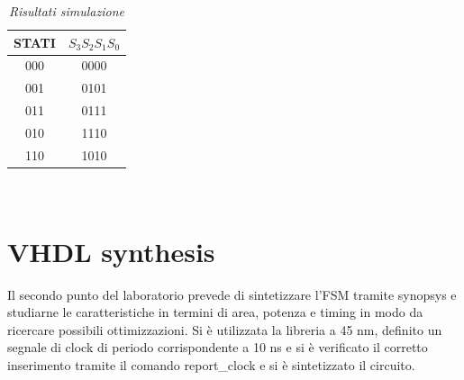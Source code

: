 \begin{table}[!h]\footnotesize
	\centering
	\begin{tabular}{|c|c|}
		\hline
		\textbf{STATI} & \textbf{$S_{3}S_{2}S_{1}S_{0}$}\\
		\hline
		000 & 0000\\
		\hline
		001 &0101 \\
		\hline
		011& 0111\\
		\hline
		010& 1110\\
		\hline
		110& 1010\\
		\hline 
	\end{tabular}
	\caption{\textit{Risultati simulazione}}
	\label{tab2}
\end{table} \\


\section{VHDL synthesis}
Il secondo punto del laboratorio prevede di sintetizzare l’FSM tramite synopsys e studiarne le caratteristiche in termini di area, potenza e timing in modo da ricercare possibili ottimizzazioni. 
Si è utilizzata la libreria a 45 nm, definito un segnale di clock di periodo corrispondente a 10 ns e si è verificato il corretto inserimento tramite il comando report_clock e si è sintetizzato il circuito. 



